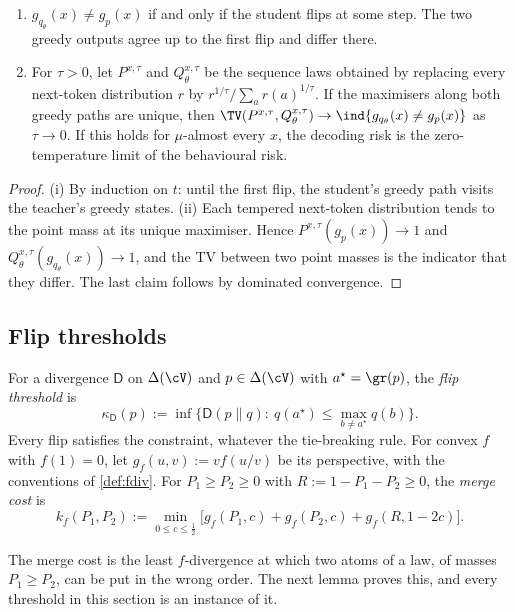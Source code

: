 \begin{lemma}\label{lem:firstflip}
\Pv
\begin{enumerate}[label=(\roman*),nosep]
\item $g_{q_\theta}(x)\neq g_p(x)$ if and only if the student flips at some step. The two greedy outputs agree up
to the first flip and differ there.
\item For $\tau>0$, let $P^{x,\tau}$ and $Q^{x,\tau}_\theta$ be the sequence laws obtained by replacing every
next-token distribution $r$ by $r^{1/\tau}/\sum_ar(a)^{1/\tau}$. If the maximisers along both greedy paths are
unique, then $\TV(P^{x,\tau},Q^{x,\tau}_\theta)\to\ind\{g_{q_\theta}(x)\neq g_p(x)\}$ as $\tau\to0$. If this holds for
$\mu$-almost every $x$, the decoding risk is the zero-temperature limit of the behavioural risk.
\end{enumerate}
\end{lemma}
\begin{proof}
(i) By induction on $t$: until the first flip, the student's greedy path visits the teacher's greedy
states. (ii) Each tempered next-token distribution tends to the point mass at its unique maximiser. Hence
$P^{x,\tau}(g_p(x))\to1$ and $Q^{x,\tau}_\theta(g_{q_\theta}(x))\to1$, and the TV between two point masses is the
indicator that they differ. The last claim follows by dominated convergence.
\end{proof}

\subsection{Flip thresholds}

\begin{definition}\label{def:flip}
For a divergence $\mathsf D$ on $\Delta(\cV)$ and $p\in\Delta(\cV)$ with $a^\star=\gr(p)$, the \emph{flip threshold} is
\[
\kappa_{\mathsf D}(p):=\inf\Big\{\mathsf D(p\|q):\ q(a^\star)\le\max_{b\ne a^\star}q(b)\Big\}.
\]
Every flip satisfies the constraint, whatever the tie-breaking rule. For convex $f$ with $f(1)=0$, let
$g_f(u,v):=vf(u/v)$ be its perspective, with the conventions of \cref{def:fdiv}. For $P_1\ge P_2\ge0$ with
$R:=1-P_1-P_2\ge0$, the \emph{merge cost} is
\[
k_f(P_1,P_2):=\min_{0\le c\le\frac12}\Big[g_f(P_1,c)+g_f(P_2,c)+g_f(R,1-2c)\Big].
\]
\end{definition}

\noindent
The merge cost is the least $f$-divergence at which two atoms of a law, of masses $P_1\ge P_2$, can be put in
the wrong order. The next lemma proves this, and every threshold in this section is an instance of it.

